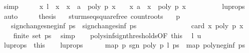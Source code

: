 \begin{isabellebody}
\ simp\isanewline
\ \ \isamarkupfalse%
\ \isamarkupfalse%
\ {\isachardoublequoteopen}{\isacharbraceleft}x{\isachardot}\ {\isacharquery}l\ {\isacharless}\ x\ {\isasymand}\ x\ {\isasymle}\ a\ {\isasymand}\ poly\ p\ x\ {\isacharequal}\ {}{\isacharbraceright}\ {\isacharequal}\ {\isacharbraceleft}x{\isachardot}\ a\ {\isasymge}\ x\ {\isasymand}\ poly\ p\ x\ {\isacharequal}\ {}{\isacharbraceright}{\isachardoublequoteclose}\isanewline
\ \ \ \ \ \ \isamarkupfalse%
\ lu{\isacharunderscore}props\ \isamarkupfalse%
\ auto\isanewline
\ \ \isamarkupfalse%
\ \isamarkupfalse%
\ {\isacharquery}thesis\ \isacommand{{\isachardot}}\isamarkupfalse%
\isanewline
{}\isamarkupfalse%
%
\endisatagproof
{\isafoldproof}%
%
\isadelimproof
\isanewline
%
\endisadelimproof
\isanewline
{}\isamarkupfalse%
\ {\isacharparenleft}\ sturm{\isacharunderscore}seq{\isacharunderscore}squarefree{\isacharparenright}\ count{\isacharunderscore}roots{\isacharcolon}\isanewline
\ \ \ {\isachardoublequoteopen}p\ {\isasymnoteq}\ {}{\isachardoublequoteclose}\isanewline
\ \ \ {\isachardoublequoteopen}sign{\isacharunderscore}changes{\isacharunderscore}neg{\isacharunderscore}inf\ ps\ {\isacharminus}\ sign{\isacharunderscore}changes{\isacharunderscore}inf\ ps\ {\isacharequal}\ \isanewline
\ \ \ \ \ \ \ \ \ \ \ \ \ card\ {\isacharbraceleft}x{\isachardot}\ poly\ p\ x\ {\isacharequal}\ {}{\isacharbraceright}{\isachardoublequoteclose}\isanewline
%
\isadelimproof
%
\endisadelimproof
%
\isatagproof
{}\isamarkupfalse%
{\isacharminus}\isanewline
\ \ \isamarkupfalse%
\ {\isachardoublequoteopen}finite\ {\isacharparenleft}set\ ps{\isacharparenright}{\isachardoublequoteclose}\ \isamarkupfalse%
\ simp\isanewline
\ \ \isamarkupfalse%
\ polys{\isacharunderscore}inf{\isacharunderscore}sign{\isacharunderscore}thresholds{\isacharbrackleft}OF\ this{\isacharbrackright}\ \isamarkupfalse%
\ l\ u\ \isacommand{{\isachardot}}\isamarkupfalse%
\isanewline
\ \ \isamarkupfalse%
\ lu{\isacharunderscore}props\ {\isacharequal}\ this\isanewline
\isanewline
\ \ \isamarkupfalse%
\ lu{\isacharunderscore}props\isanewline
\ \ \ \ \isamarkupfalse%
\ {\isachardoublequoteopen}map\ {\isacharparenleft}{\isasymlambda}p{\isachardot}\ sgn\ {\isacharparenleft}poly\ p\ l{\isacharparenright}{\isacharparenright}\ ps\ {\isacharequal}\ map\ poly{\isacharunderscore}neg{\isacharunderscore}inf\ ps{\isachardoublequoteclose}\isanewline

\end{isabellebody}
